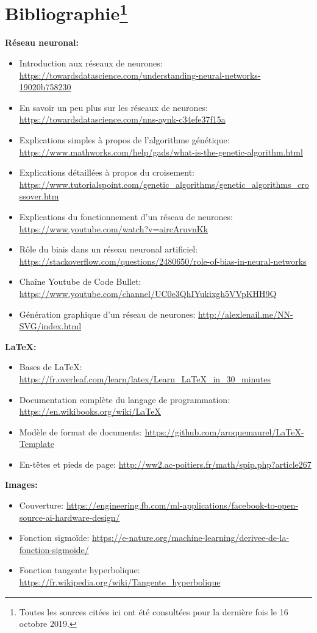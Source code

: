 \documentclass[12pt, a4paper, openany]{book}
\begin{document}
\section*{Bibliographie\footnote{Toutes les sources citées ici ont été consultées pour la dernière fois le 16 octobre 2019.}}
\textbf{Réseau neuronal:}
\begin{itemize}
	\item Introduction aux réseaux de neurones: \url{https://towardsdatascience.com/understanding-neural-networks-19020b758230}
	\item En savoir un peu plus sur les réseaux de neurones: \url{https://towardsdatascience.com/nns-aynk-c34efe37f15a}
	\item Explications simples à propos de l’algorithme génétique: \url{https://www.mathworks.com/help/gads/what-is-the-genetic-algorithm.html}
	\item Explications détaillées à propos du croisement: \url{https://www.tutorialspoint.com/genetic_algorithms/genetic_algorithms_crossover.htm}
	\item Explications du fonctionnement d'un réseau de neurones: \url{https://www.youtube.com/watch?v=aircAruvnKk}
	\item Rôle du biais dans un réseau neuronal artificiel: \url{https://stackoverflow.com/questions/2480650/role-of-bias-in-neural-networks}
	\item Chaîne Youtube de Code Bullet: \url{https://www.youtube.com/channel/UC0e3QhIYukixgh5VVpKHH9Q}
	\item Génération graphique d'un réseau de neurones: \url{http://alexlenail.me/NN-SVG/index.html}
\end{itemize}

\textbf{\LaTeX:}
\begin{itemize}
	\item Bases de \LaTeX: \url{https://fr.overleaf.com/learn/latex/Learn_LaTeX_in_30_minutes}
	\item Documentation complète du langage de programmation: \url{https://en.wikibooks.org/wiki/LaTeX}
	\item Modèle de format de documents: \url{https://github.com/aroquemaurel/LaTeX-Template}
	\item En-têtes et pieds de page: \url{http://ww2.ac-poitiers.fr/math/spip.php?article267}
\end{itemize}

\textbf{Images:}
\begin{itemize}
	\item Couverture: \url{https://engineering.fb.com/ml-applications/facebook-to-open-source-ai-hardware-design/}
	\item Fonction sigmoïde: \url{https://e-nature.org/machine-learning/derivee-de-la-fonction-sigmoide/}
	\item Fonction tangente hyperbolique: \url{https://fr.wikipedia.org/wiki/Tangente_hyperbolique}
\end{itemize}
\end{document}
